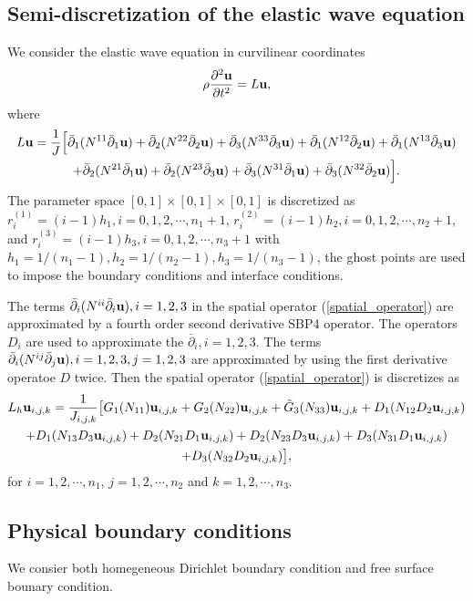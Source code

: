 \documentclass[a4paper]{article}
\begin{document}
\subsection{Semi-discretization of the elastic wave equation}
We consider the elastic wave equation in curvilinear coordinates 
\[\rho\frac{\partial^2 {\bf u}}{\partial t^2} = L{\bf u},\]
where
\begin{multline}\label{spatial_operator}
L{\bf u} = \frac{1}{J}\Big[\bar{\partial}_1(N^{11}\bar{\partial}_1{\bf u}) + \bar{\partial}_2(N^{22}\bar{\partial}_2{\bf u}) + \bar{\partial}_3(N^{33}\bar{\partial}_3{\bf u}) + \bar{\partial}_1(N^{12}\bar{\partial}_2{\bf u}) + \bar{\partial}_1(N^{13}\bar{\partial}_3{\bf u}) \\
+ \bar{\partial}_2(N^{21}\bar{\partial}_1{\bf u}) + \bar{\partial}_2(N^{23}\bar{\partial}_3{\bf u}) +\bar{\partial}_3(N^{31}\bar{\partial}_1{\bf u}) + \bar{\partial}_3(N^{32}\bar{\partial}_2{\bf u})\Big].
\end{multline}
The parameter space $[0,1]\times[0,1]\times[0,1]$ is discretized as $r_i^{(1)} = (i-1)h_1, i = 0,1,2,\cdots,n_1+1$, $r_i^{(2)} = (i-1)h_2, i = 0,1,2,\cdots,n_2+1$, and $r_i^{(3)} = (i-1)h_3, i = 0,1,2,\cdots,n_3+1$ with $h_1 = 1/(n_1-1), h_2 = 1/(n_2-1), h_3 = 1/(n_3-1)$, the ghost points are used to impose the boundary conditions and interface conditions.

The terms $\bar{\partial}_i(N^{ii}\bar{\partial}_i{\bf u}), i = 1,2,3$ in the spatial operator (\ref{spatial_operator}) are approximated by a fourth order second derivative SBP4 operator. The operators $D_i$ are used to approximate the $\bar{\partial}_i, i = 1,2,3$. The terms $\bar{\partial}_i(N^{ij}\bar{\partial}_j{\bf u}), i = 1,2,3, j = 1,2,3$ are approximated by using the first derivative operatoe $D$ twice. Then the spatial operator (\ref{spatial_operator}) is discretizes as
\begin{multline}
L_h{\bf u}_{i,j,k} = \frac{1}{J_{i,j,k}}\big[G_1(N_{11}){\bf u}_{i,j,k}+G_2(N_{22}){\bf u}_{i,j,k}+\tilde{G}_3(N_{33}){\bf u}_{i,j,k}+D_1(N_{12}D_2{\bf u}_{i,j,k})\\
+D_1(N_{13}D_3{\bf u}_{i,j,k})+D_2(N_{21}D_1{\bf u}_{i,j,k})+D_2(N_{23}D_3{\bf u}_{i,j,k})+D_3(N_{31}D_1{\bf u}_{i,j,k})\\
+D_3(N_{32}D_2{\bf u}_{i,j,k})\big],
\end{multline}
for $i = 1,2,\cdots,n_1$, $j = 1,2,\cdots,n_2$ and $k = 1,2,\cdots,n_3$.
 
\subsection{Physical boundary conditions}
We consier both homegeneous Dirichlet boundary condition and free surface bounary condition.
\end{document}
